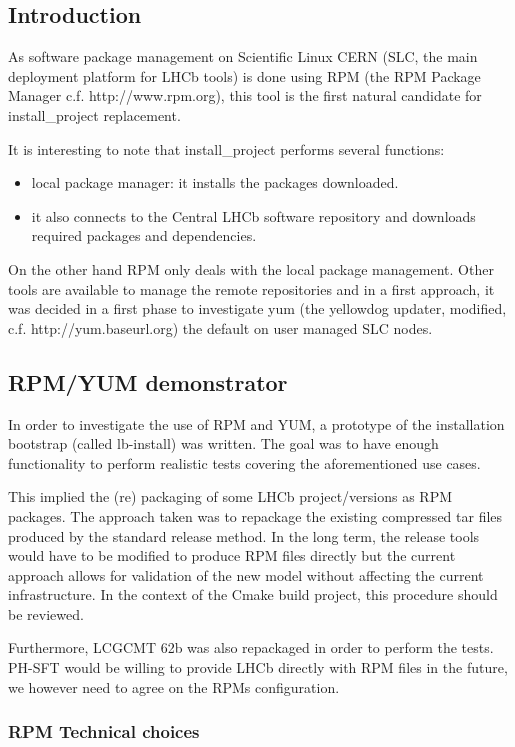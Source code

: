 \documentclass{lhcbnote}
\begin{document}
\subsection{Introduction}

As software package management on Scientific Linux CERN (SLC, the main deployment platform for LHCb tools) is done using RPM (the RPM Package Manager c.f. http://www.rpm.org), this tool is the first natural candidate for install\_project replacement.

It is interesting to note that install\_project performs several functions:
\begin{itemize}
\item local package manager: it installs the packages downloaded.
\item it also connects to the Central LHCb software repository and downloads required packages and dependencies. 
\end{itemize}
On the other hand RPM only deals with the local package management.
Other tools are available to manage the remote repositories and in a first approach, it was decided in a first phase to investigate yum (the yellowdog updater, modified, c.f. http://yum.baseurl.org) the default on user managed SLC nodes.

\subsection{RPM/YUM demonstrator}

In order to investigate the use of RPM and YUM, a prototype of the installation bootstrap (called lb-install) was written. The goal was to have enough functionality to perform realistic tests covering the aforementioned use cases.

This implied the (re) packaging of some LHCb project/versions as RPM packages. The approach taken was to repackage the existing compressed tar files produced by the standard release method. In the long term, the release tools would have to be modified to produce RPM files directly but the current approach allows for validation of the new model without affecting the current infrastructure. In the context of the Cmake build project, this procedure should be reviewed.

Furthermore, LCGCMT 62b was also repackaged in order to perform the tests. PH-SFT would be willing to provide LHCb directly with RPM files in the future, we however need to agree on the RPMs configuration.

\subsubsection{RPM Technical choices}
\end{document}
